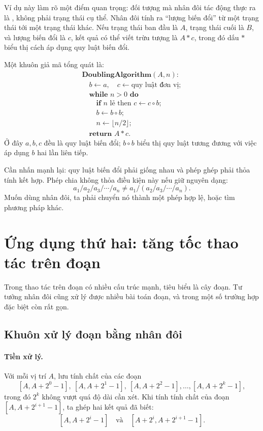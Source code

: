 \documentclass[11pt]{article}
\begin{document}
Ví dụ này làm rõ một điểm quan trọng: đối tượng mà nhân đôi tác động thực ra
là , không phải trạng thái cụ thể. Nhân đôi tính ra
``lượng biến đổi'' từ một trạng thái tới một trạng thái khác. Nếu trạng thái
ban đầu là $A$, trạng thái cuối là $B$, và lượng biến đổi là $c$, kết quả có
thể viết trừu tượng là $A*c$, trong đó dấu $*$ biểu thị cách áp dụng quy luật
biến đổi.

Một khuôn giả mã tổng quát là:
\[
\begin{array}{l}
\textbf{DoublingAlgorithm}(A,n):\\
\quad b\gets a,\quad c\gets \text{quy luật đơn vị};\\
\quad \textbf{while }n>0\textbf{ do}\\
\quad\quad \textbf{if }n\text{ lẻ then }c\gets c\circ b;\\
\quad\quad b\gets b\circ b;\\
\quad\quad n\gets \lfloor n/2\rfloor;\\
\quad \textbf{return }A*c.
\end{array}
\]
Ở đây $a,b,c$ đều là quy luật biến đổi; $b\circ b$ biểu thị quy luật tương
đương với việc áp dụng $b$ hai lần liên tiếp.

Cần nhấn mạnh lại: quy luật biến đổi phải giống nhau và phép ghép phải thỏa
tính kết hợp. Phép chia không thỏa điều kiện này nếu giữ nguyên dạng:
\[
  a_1/a_2/a_3/\cdots/a_n
  \ne a_1/(a_2/a_3/\cdots/a_n).
\]
Muốn dùng nhân đôi, ta phải chuyển nó thành một phép hợp lệ, hoặc tìm phương
pháp khác.

\section{Ứng dụng thứ hai: tăng tốc thao tác trên đoạn}

Trong thao tác trên đoạn có nhiều cấu trúc mạnh, tiêu biểu là cây đoạn. Tư
tưởng nhân đôi cũng xử lý được nhiều bài toán đoạn, và trong một số trường
hợp đặc biệt còn rất gọn.

\subsection{Khuôn xử lý đoạn bằng nhân đôi}

\paragraph{Tiền xử lý.}
Với mỗi vị trí $A$, lưu tính chất của các đoạn
\[
  [A,A+2^0-1],\ [A,A+2^1-1],\ [A,A+2^2-1],\ldots,
  [A,A+2^k-1],
\]
trong đó $2^k$ không vượt quá độ dài cần xét. Khi tính tính chất của đoạn
$[A,A+2^{i+1}-1]$, ta ghép hai kết quả đã biết:
\[
  [A,A+2^i-1]\quad\text{và}\quad
  [A+2^i,A+2^{i+1}-1].
\]
\end{document}

